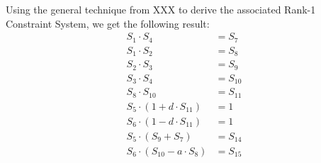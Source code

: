 Using the general technique from XXX to derive the associated Rank-1 Constraint System, we get the following result:
\begin{align*}
S_1 \cdot S_4 & = S_7 \\
S_1 \cdot S_2 & = S_8 \\
S_2 \cdot S_3 & = S_9 \\
S_3 \cdot S_4 & = S_{10} \\
S_8 \cdot S_{10} & = S_{11} \\
S_5 \cdot (1+ d\cdot S_{11}) & = 1 \\
S_6 \cdot (1 - d\cdot S_{11}) & = 1 \\
S_5 \cdot (S_9 + S_7) & = S_{14} \\
S_6 \cdot (S_{10} - a\cdot S_8) & = S_{15}
\end{align*}

